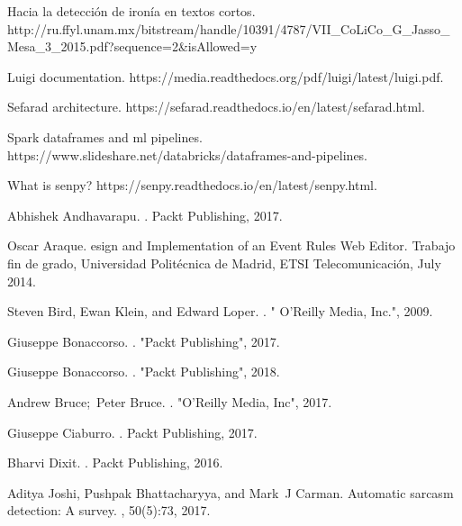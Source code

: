 \begin{thebibliography}{10}

Hacia la detección de ironía en textos cortos.
\newblock http://ru.ffyl.unam.mx/bitstream/handle/10391/4787/VII_CoLiCo_G_Jasso_Mesa_3_2015.pdf?sequence=2&isAllowed=y

Luigi documentation.
\newblock https://media.readthedocs.org/pdf/luigi/latest/luigi.pdf.

Sefarad architecture.
\newblock https://sefarad.readthedocs.io/en/latest/sefarad.html.

Spark dataframes and ml pipelines.
\newblock https://www.slideshare.net/databricks/dataframes-and-pipelines.

What is senpy?
\newblock https://senpy.readthedocs.io/en/latest/senpy.html.

Abhishek Andhavarapu.
.
\newblock Packt Publishing, 2017.

Oscar Araque.
esign and {I}mplementation of an {E}vent {R}ules {W}eb {E}ditor.
\newblock Trabajo fin de grado, Universidad Polit{\'e}cnica de Madrid, ETSI
  Telecomunicaci{\'o}n, July 2014.

Steven Bird, Ewan Klein, and Edward Loper.
.
\newblock " O'Reilly Media, Inc.", 2009.

Giuseppe Bonaccorso.
.
\newblock "Packt Publishing", 2017.

Giuseppe Bonaccorso.
.
\newblock "Packt Publishing", 2018.

Andrew Bruce;~Peter Bruce.
.
\newblock "O'Reilly Media, Inc", 2017.

Giuseppe Ciaburro.
.
\newblock Packt Publishing, 2017.

Bharvi Dixit.
.
\newblock Packt Publishing, 2016.

Aditya Joshi, Pushpak Bhattacharyya, and Mark~J Carman.
\newblock Automatic sarcasm detection: A survey.
, 50(5):73, 2017.


\end{thebibliography}
